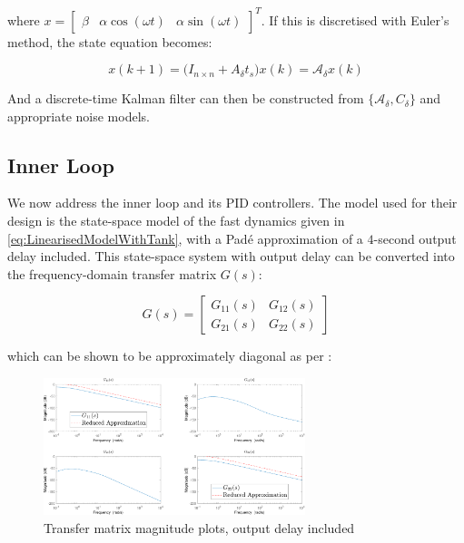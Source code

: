 where $x = \begin{bmatrix}\beta & \alpha \cos(\omega t) & \alpha \sin(\omega t)\end{bmatrix}^T$. If this is discretised with Euler's method, the state equation becomes:

\begin{equation}\label{eq:TheisticDisturbanceEstimatorDiscrete}
	x(k+1) = \Big(I_{n\times n} + A_\delta t_s \Big) x(k) = \mathcal{A}_\delta x(k)
\end{equation}

And a discrete-time Kalman filter can then be constructed from $\{\mathcal{A}_\delta,C_\delta\}$ and appropriate noise models.

\subsection{Inner Loop}\label{subsec:InnerLoop}

We now address the inner loop and its PID controllers. The model used for their design is the state-space model of the fast dynamics given in \cref{eq:LinearisedModelWithTank}, with a Padé approximation of a $4$-second output delay included. This state-space system with output delay can be converted into the frequency-domain transfer matrix $G(s)$:

\begin{equation}\label{eq:TransferMatrix}
	G(s) = \begin{bmatrix} G_{11}(s) & G_{12}(s) \\ G_{21}(s) & G_{22}(s)\end{bmatrix}
\end{equation}

which can be shown to be approximately diagonal as per :

\begin{figure}[h!]
 	\centering
 	\includegraphics[width=\linewidth,height=4cm]{Graphics/PumpMagPlot.pdf}
 	\caption{Transfer matrix magnitude plots, output delay included}
 	\label{fig:BodeMagDelayPlot}
\end{figure}


